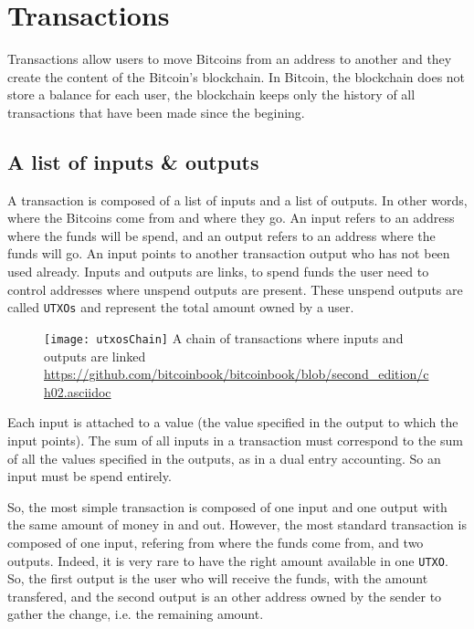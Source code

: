 \section{Transactions}

Transactions allow users to move Bitcoins from an address to another and they create
the content of the Bitcoin's blockchain. In Bitcoin, the blockchain does not store a
balance for each user, the blockchain keeps only the history of all transactions that
have been made since the begining.

\subsection{A list of inputs \& outputs}

A transaction is composed of a list of inputs and a list of outputs. In other words,
where the Bitcoins come from and where they go. An input refers to an address where
the funds will be spend, and an output refers to an address where the funds will
go. An input points to another transaction output who has not been used already.
Inputs and outputs are links, to spend funds the user need to control addresses
where unspend outputs are present. These unspend outputs are called \texttt{UTXOs}
and represent the total amount owned by a user.

\begin{figure}[H]
	\centering
	\texttt{[image: utxosChain]}
  {A chain of transactions where inputs and outputs are linked}
	{\url{https://github.com/bitcoinbook/bitcoinbook/blob/second_edition/ch02.asciidoc}}
	\label{fig:utxosChain}
\end{figure}

Each input is attached to a value (the value specified in the output to which the
input points). The sum of all inputs in a transaction must correspond to the sum
of all the values specified in the outputs, as in a dual entry accounting. So an
input must be spend entirely.

So, the most simple transaction is composed of one input and one output with the same
amount of money in and out.
However, the most standard transaction is composed of one input, refering from where the
funds come from, and two outputs. Indeed, it is very rare to have the right amount
available in one \texttt{UTXO}. So, the first output is the user who will receive
the funds, with the amount transfered, and the second output is an other address
owned by the sender to gather the change, i.e. the remaining amount.

